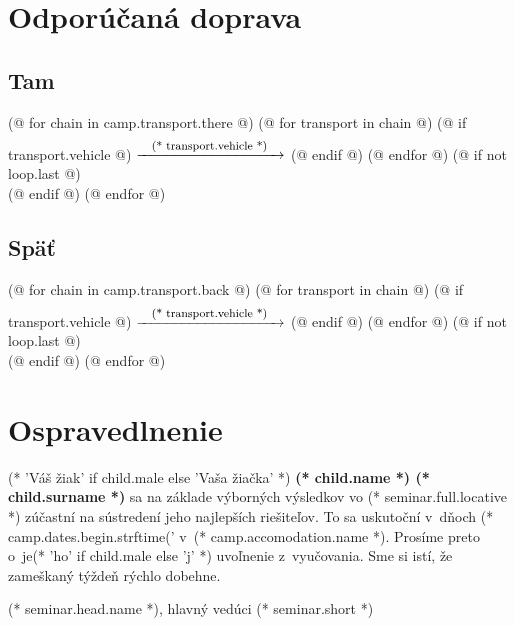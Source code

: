 \documentclass[12pt, twoside]{article}
\begin{document}
    \clearpage

    \section{Odporúčaná doprava}
        \subsection{Tam}
        (@ for chain in camp.transport.there @)
            (@ for transport in chain @)
                (@ if transport.vehicle @) $\xrightarrow{\raisebox{-4mm}{\footnotesize\text{\quad (* transport.vehicle *)\quad}}}$ (@ endif @)
            (@ endfor @)%
            (@ if not loop.last @)\\(@ endif @)
        (@ endfor @)
        \subsection{Späť}
        (@ for chain in camp.transport.back @)
            (@ for transport in chain @)
                (@ if transport.vehicle @) $\xrightarrow{\raisebox{-4mm}{\footnotesize\text{\quad (* transport.vehicle *)\quad}}}$ (@ endif @)
            (@ endfor @)%
            (@ if not loop.last @)\\(@ endif @)
        (@ endfor @)

    \cutHere

    \section{Ospravedlnenie}
        (* 'Váš žiak' if child.male else 'Vaša žiačka' *) \textbf{(* child.name *) (* child.surname *)} sa na základe výborných výsledkov vo (* seminar.full.locative *)
        zúčastní na sústredení jeho najlepších riešiteľov. To sa uskutoční v~dňoch (* camp.dates.begin.strftime('%
        v~(* camp.accomodation.name *). Prosíme preto o~je(* 'ho' if child.male else 'j' *) uvoľnenie z~vyučovania.
        Sme si istí, že zameškaný týždeň rýchlo dobehne.
        \vspace{5mm}

        \hfill (* seminar.head.name *), hlavný vedúci (* seminar.short *)
    
    \cutHere
\end{document}
